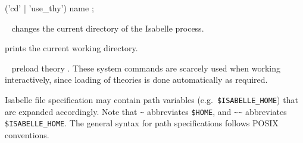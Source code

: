\begin{isabellebody}
\begin{isamarkuptext}
  \begin{rail}
    ('cd' | 'use_thy') name
    ;
  \end{rail}

  \begin{description}

  \item \hyperlink{command.cd}{\mbox{}}~ changes the current directory
  of the Isabelle process.

  \item \hyperlink{command.pwd}{\mbox{}} prints the current working directory.

  \item \hyperlink{command.use-thy}{\mbox{}}~ preload theory .
  These system commands are scarcely used when working interactively,
  since loading of theories is done automatically as required.

  \end{description}

  Isabelle file specification may contain path variables (e.g.\
  \verb|$ISABELLE_HOME|) that are expanded accordingly.  Note
  that \verb|~| abbreviates \verb|$HOME|, and \verb|~~| abbreviates \verb|$ISABELLE_HOME|.  The general syntax
  for path specifications follows POSIX conventions.%
\end{isamarkuptext}%
\isamarkuptrue%
%
\isadelimtheory
%
\endisadelimtheory
%
\isatagtheory
{}\isamarkupfalse%
%
\endisatagtheory
{\isafoldtheory}%
%
\isadelimtheory
%
\endisadelimtheory
\isanewline
\end{isabellebody}%
